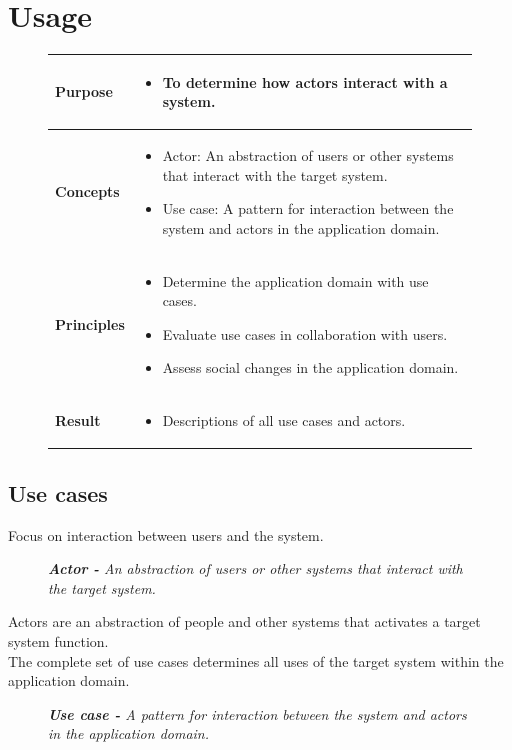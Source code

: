 \chapter{Usage \ooad[121]}
\begin{figure}[H]
    \begin{tabular}{|l|p{12cm}|}
        \hline
        \textbf{Purpose} & \begin{itemize}
            \item To determine how actors interact with a system.
        \end{itemize} \\\hline
        \textbf{Concepts} & \begin{itemize}
            \item Actor: An abstraction of users or other systems that interact with the target system.
            \item Use case: A pattern for interaction between the system and actors in the application domain.
        \end{itemize} \\\hline
        \textbf{Principles} & \begin{itemize}
            \item Determine the application domain with use cases.
            \item Evaluate use cases in collaboration with users.
            \item Assess social changes in the application domain.
        \end{itemize} \\\hline
        \textbf{Result} & \begin{itemize}
            \item Descriptions of all use cases and actors.
        \end{itemize} \\\hline
    \end{tabular}
\end{figure}

\section{Use cases}
Focus on interaction between users and the system.
\begin{figure}[H]
    \textit{\textbf{Actor -} An abstraction of users or other systems that interact with the target system.}
\end{figure}
Actors are an abstraction of people and other systems that activates a target system function.\\
The complete set of use cases determines all uses of the target system within the application domain.
\begin{figure}[H]
    \textit{\textbf{Use case -} A pattern for interaction between the system and actors in the application domain.}
\end{figure}

